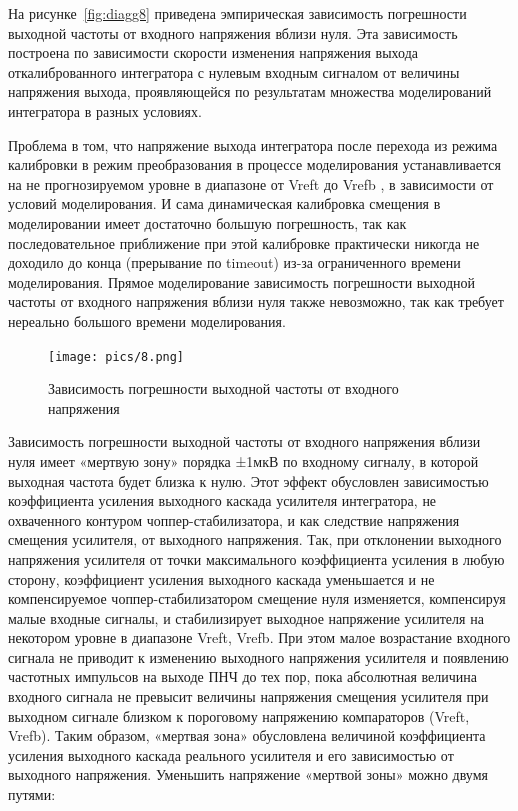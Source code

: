 \documentclass[a4paper,12pt,oneside]{scrartcl}
\begin{document}
На рисунке~\ref{fig:diagg8} приведена эмпирическая зависимость погрешности выходной частоты от входного напряжения вблизи нуля. Эта зависимость построена по зависимости скорости изменения напряжения выхода откалиброванного интегратора с нулевым входным сигналом от величины напряжения выхода, проявляющейся по результатам множества моделирований интегратора в разных условиях. 

Проблема в том, что напряжение выхода интегратора после перехода из режима калибровки в режим преобразования в процессе моделирования устанавливается на не прогнозируемом уровне в диапазоне от Vreft  до Vrefb , в зависимости от условий моделирования. И сама динамическая калибровка смещения в моделировании имеет достаточно большую погрешность, так как последовательное приближение при этой калибровке практически никогда не доходило до конца (прерывание по timeout) из-за ограниченного времени моделирования. Прямое моделирование зависимость погрешности выходной частоты от входного напряжения вблизи нуля также невозможно, так как требует нереально большого времени моделирования.

\begin{figure}[!htb]
\centering
\texttt{[image: pics/8.png]}
\caption{Зависимость погрешности выходной частоты от входного напряжения}
\label{fig:diagg7}
\end{figure}
\FloatBarrier


Зависимость погрешности выходной частоты от входного напряжения вблизи нуля имеет «мертвую зону» порядка ±1мкВ по входному сигналу, в которой выходная частота будет близка к нулю. Этот эффект обусловлен зависимостью коэффициента усиления выходного каскада усилителя интегратора, не охваченного контуром чоппер-стабилизатора, и как следствие напряжения смещения усилителя, от выходного напряжения. Так, при отклонении выходного напряжения усилителя от точки максимального коэффициента усиления в любую сторону, коэффициент усиления выходного каскада уменьшается и не компенсируемое чоппер-стабилизатором смещение нуля изменяется, компенсируя малые входные сигналы, и стабилизирует выходное напряжение усилителя на некотором уровне в диапазоне Vreft, Vrefb. При этом малое возрастание входного сигнала не приводит к изменению выходного напряжения усилителя и появлению частотных импульсов на выходе ПНЧ до тех пор, пока абсолютная величина входного сигнала не превысит величины напряжения смещения усилителя при выходном сигнале близком к пороговому напряжению компараторов (Vreft, Vrefb). 
Таким образом, «мертвая зона» обусловлена величиной коэффициента усиления выходного каскада реального усилителя и его зависимостью от выходного напряжения. 
Уменьшить напряжение «мертвой зоны» можно двумя путями:
\end{document}
